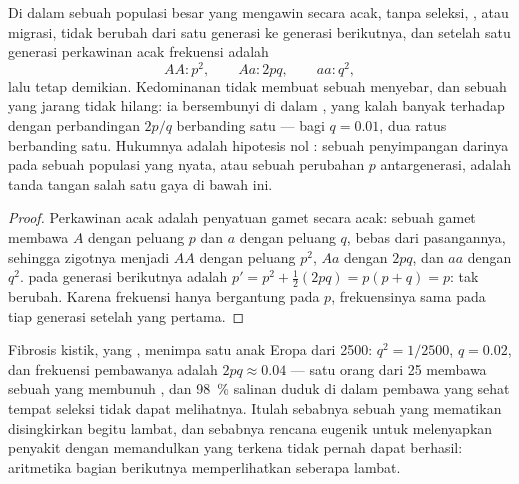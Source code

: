\begin{theorem}\label{thm:b2:population-genetics:hw}
Di dalam sebuah populasi besar yang mengawin secara acak, tanpa
seleksi, , atau migrasi,  tidak berubah dari
satu generasi ke generasi berikutnya, dan setelah satu generasi
perkawinan acak frekuensi  adalah
\[
AA : p^{2}, \qquad Aa : 2pq, \qquad aa : q^{2},
\]
lalu tetap demikian. Kedominanan tidak membuat sebuah  
menyebar, dan sebuah   yang jarang tidak hilang: ia
bersembunyi di dalam , yang kalah banyak terhadap
 dengan perbandingan $2p/q$ berbanding satu --- bagi $q = 0.01$, dua ratus berbanding satu. Hukumnya adalah hipotesis nol
: sebuah penyimpangan darinya pada sebuah populasi
yang nyata, atau sebuah perubahan $p$ antargenerasi, adalah tanda
tangan salah satu gaya di bawah ini.
\end{theorem}
\begin{proof}
Perkawinan acak adalah penyatuan gamet secara acak: sebuah gamet
membawa $A$ dengan peluang $p$ dan $a$ dengan peluang $q$, bebas dari
pasangannya, sehingga zigotnya menjadi $AA$ dengan peluang $p^{2}$,
$Aa$ dengan $2pq$, dan $aa$ dengan $q^{2}$.  pada
generasi berikutnya adalah $p' = p^{2} + \tfrac12(2pq) = p(p + q) = p$:
tak berubah. Karena frekuensi  hanya bergantung pada $p$,
frekuensinya sama pada tiap generasi setelah yang pertama.
\end{proof}

\begin{example}\label{ex:b2:population-genetics:cf}
Fibrosis kistik, yang , menimpa satu anak Eropa dari 2500:
$q^{2} = 1/2500$, $q = 0.02$, dan frekuensi pembawanya adalah $2pq
\approx 0.04$ --- satu orang dari 25 membawa sebuah  yang membunuh
, dan \qty{98}{\%} salinan  duduk di dalam pembawa
yang sehat tempat seleksi tidak dapat melihatnya. Itulah sebabnya
sebuah   yang mematikan disingkirkan begitu lambat, dan
sebabnya rencana eugenik untuk melenyapkan penyakit  dengan
memandulkan yang terkena tidak pernah dapat berhasil: aritmetika bagian
berikutnya memperlihatkan seberapa lambat.
\end{example}

